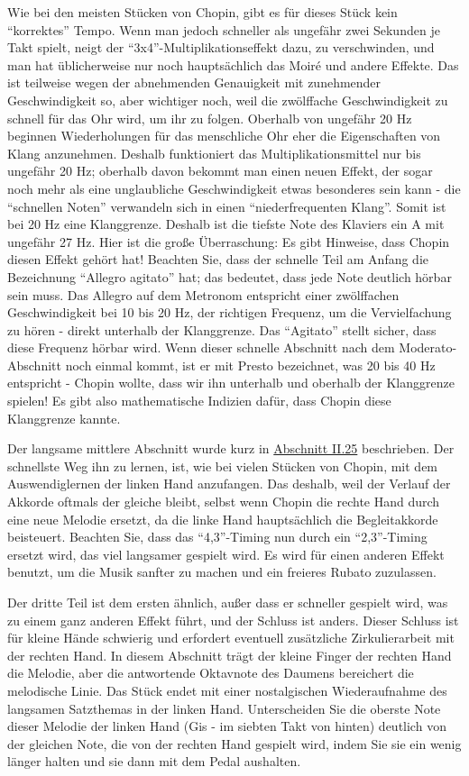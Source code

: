Wie bei den meisten Stücken von Chopin, gibt es für dieses Stück kein \enquote{korrektes} Tempo.
Wenn man jedoch schneller als ungefähr zwei Sekunden je Takt spielt, neigt der \enquote{3x4}-Multiplikationseffekt dazu, zu verschwinden, und man hat üblicherweise nur noch hauptsächlich das Moiré und andere Effekte.
Das ist teilweise wegen der abnehmenden Genauigkeit mit zunehmender Geschwindigkeit so, aber wichtiger noch, weil die zwölffache Geschwindigkeit zu schnell für das Ohr wird, um ihr zu folgen.
Oberhalb von ungefähr 20 Hz beginnen Wiederholungen für das menschliche Ohr eher die Eigenschaften von Klang anzunehmen.
Deshalb funktioniert das Multiplikationsmittel nur bis ungefähr 20 Hz; oberhalb davon bekommt man einen neuen Effekt, der sogar noch mehr als eine unglaubliche Geschwindigkeit etwas besonderes sein kann - die \enquote{schnellen Noten} verwandeln sich in einen \enquote{niederfrequenten Klang}.
Somit ist bei 20 Hz eine Klanggrenze.
Deshalb ist die tiefste Note des Klaviers ein A mit ungefähr 27 Hz.
Hier ist die große Überraschung: Es gibt Hinweise, dass Chopin diesen Effekt gehört hat!
Beachten Sie, dass der schnelle Teil am Anfang die Bezeichnung \enquote{Allegro agitato} hat; das bedeutet, dass jede Note deutlich hörbar sein muss.
Das Allegro auf dem Metronom entspricht einer zwölffachen Geschwindigkeit bei 10 bis 20 Hz, der richtigen Frequenz, um die Vervielfachung zu hören - direkt unterhalb der Klanggrenze.
Das \enquote{Agitato} stellt sicher, dass diese Frequenz hörbar wird.
Wenn dieser schnelle Abschnitt nach dem Moderato-Abschnitt noch einmal kommt, ist er mit Presto bezeichnet, was 20 bis 40 Hz entspricht - Chopin wollte, dass wir ihn unterhalb und oberhalb der Klanggrenze spielen!
Es gibt also mathematische Indizien dafür, dass Chopin diese Klanggrenze kannte.

Der langsame mittlere Abschnitt wurde kurz in \hyperref[c1ii25]{Abschnitt II.25} beschrieben.
Der schnellste Weg ihn zu lernen, ist, wie bei vielen Stücken von Chopin, mit dem Auswendiglernen der linken Hand anzufangen.
Das deshalb, weil der Verlauf der Akkorde oftmals der gleiche bleibt, selbst wenn Chopin die rechte Hand durch eine neue Melodie ersetzt, da die linke Hand hauptsächlich die Begleitakkorde beisteuert.
Beachten Sie, dass das \enquote{4,3}-Timing nun durch ein \enquote{2,3}-Timing ersetzt wird, das viel langsamer gespielt wird.
Es wird für einen anderen Effekt benutzt, um die Musik sanfter zu machen und ein freieres Rubato zuzulassen.

Der dritte Teil ist dem ersten ähnlich, außer dass er schneller gespielt wird, was zu einem ganz anderen Effekt führt, und der Schluss ist anders.
Dieser Schluss ist für kleine Hände schwierig und erfordert eventuell zusätzliche Zirkulierarbeit mit der rechten Hand.
In diesem Abschnitt trägt der kleine Finger der rechten Hand die Melodie, aber die antwortende Oktavnote des Daumens bereichert die melodische Linie.
Das Stück endet mit einer nostalgischen Wiederaufnahme des langsamen Satzthemas in der linken Hand.
Unterscheiden Sie die oberste Note dieser Melodie der linken Hand (Gis - im siebten Takt von hinten) deutlich von der gleichen Note, die von der rechten Hand gespielt wird, indem Sie sie ein wenig länger halten und sie dann mit dem Pedal aushalten.

